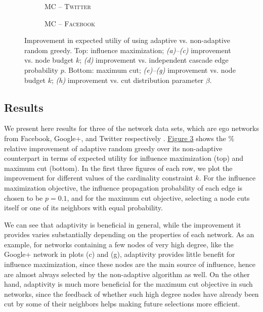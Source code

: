 \documentclass{article}
\newcommand{\figref}[1]{\hyperref[#1]{Figure \ref*{#1}}}
\newcommand{\fbook}{\textsc{Facebook}\xspace}
\newcommand{\twitter}{\textsc{Twitter}\xspace}
\newcommand{\maxcut}{MC\xspace}
\begin{document}
\begin{figure}[tb]
\begin{subfigure}[b]{\subflen}
    \caption{\hspace{\scspacex}\maxcut{} -- \twitter}
    \label{fig:mc_twitter}
  \end{subfigure}
  \begin{subfigure}[b]{\subflen}
    
    \vspace{\scspacey}
    \caption{\hspace{\scspacex}\maxcut{} -- \fbook}
    \label{fig:pmc_gplus}
  \end{subfigure}
  \caption{
    Improvement in expected utiliy of using adaptive vs. non-adaptive random greedy.
    Top: influence maximization; \emph{(a)--(c)} improvement vs. node budget $k$; \emph{(d)} improvement vs. independent cascade edge probability $p$.
    Bottom: maximum cut; \emph{(e)--(g)} improvement vs. node budget $k$; \emph{(h)} improvement vs. cut distribution parameter $\beta$.
  }
  \label{fig:exp}
\end{figure}

\subsection{Results}
We present here results for three of the network data sets, which are ego networks from Facebook, Google+, and Twitter respectively \cite{mcauley12}.
\figref{fig:exp} shows the $\%$ relative improvement of adaptive random greedy over its non-adaptive counterpart in terms of expected utility for influence maximization (top) and maximum cut (bottom).
In the first three figures of each row, we plot the improvement for different values of the cardinality constraint $k$.
For the influence maximization objective, the influence propagation probability of each edge is chosen to be $p=0.1$, and for the maximum cut objective, selecting a node cuts itself or one of its neighbors with equal probability.

We can see that adaptivity is beneficial in general, while the improvement it provides varies substantially depending on the properties of each network.
As an example, for networks containing a few nodes of very high degree, like the Google+ network in plots (c) and (g), adaptivity provides little benefit for influence maximization, since these nodes are the main source of influence, hence are almost always selected by the non-adaptive algorithm as well.
On the other hand, adaptivity is much more beneficial for the maximum cut objective in such networks, since the feedback of whether such high degree nodes have already been cut by some of their neighbors helps making future selections more efficient.
\end{document}
